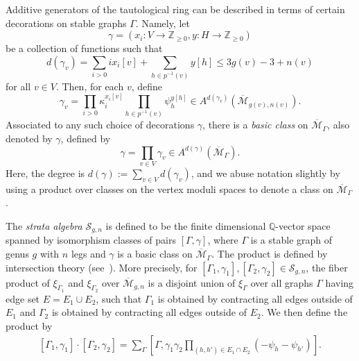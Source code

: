 \documentclass[12pt,reqno]{amsart}
\theoremstyle{plain}
\theoremstyle{definition}
\theoremstyle{remark}
\begin{document}
Additive generators of the tautological ring can be described in terms of certain decorations on stable graphs $\Gamma$.  Namely, let
\begin{equation*}
\gamma=(x_i:V\to \mathbb{Z}_{\geq 0},y:H\to \mathbb{Z}_{\geq 0})
\end{equation*}
be a collection of functions such that
\begin{equation*}
d(\gamma_v)=\sum_{i>0}ix_i[v]+\sum_{h\in p^{-1}(v)} y[h]\leq 3g(v)-3+n(v)
\end{equation*}
for all $v\in V$.  Then, for each $v$, define
\begin{equation*}
\gamma_v=\prod_{i>0}\kappa_i^{x_i[v]}\prod_{h\in p^{-1}(v)}
\psi_h^{y[h]}\in A^{d(\gamma_v)}(\overline{\mathcal{M}}_{g(v),n(v)}).
\end{equation*}
Associated to any such choice of decorations $\gamma$, there is a {\it basic class} on $\overline{\mathcal{M}}_{\Gamma}$, also denoted by $\gamma$, defined by
\begin{equation*}
\gamma=\prod_{v\in V}\gamma_v \in A^{d(\gamma)}(\overline{\mathcal{M}}_{\Gamma}).
\end{equation*}
Here, the degree is $d(\gamma):=\sum_{v\in V}d(\gamma_v)$, and we abuse notation slightly by using a product over classes on the vertex moduli spaces to denote a class on $\overline{\mathcal{M}}_{\Gamma}$.

The {\it strata algebra} $\mathcal{S}_{g,n}$ is defined to be  the finite dimensional $\mathbb{Q}$-vector space spanned by isomorphism classes of pairs $[\Gamma,\gamma]$, where $\Gamma$ is a stable graph of genus $g$ with $n$ legs and $\gamma$ is a basic class on $\overline{\mathcal{M}}_{\Gamma}$.  The product is defined by intersection theory (see~\cite{faber1999algorithms}).  More precisely, for $[\Gamma_1,\gamma_1], [\Gamma_2,\gamma_2]\in \mathcal{S}_{g,n}$, the fiber product of $\xi_{\Gamma_1}$ and $\xi_{\Gamma_2}$ over $\overline{\mathcal{M}}_{g,n}$ is a disjoint union of $\xi_{\Gamma}$ over all graphs $\Gamma$ having edge set $E=E_1\cup E_2$, such that $\Gamma_1$ is obtained by contracting all edges outside of $E_1$ and $\Gamma_2$ is obtained by contracting all edges outside of $E_2$. We then define the product by
\begin{align}\label{eqn:stra-prod}
[\Gamma_1,\gamma_1]\cdot [\Gamma_2,\gamma_2]=\sum_{\Gamma}\left[\Gamma,\gamma_1\gamma_2\prod_{(h,h')\in E_1\cap E_2}(-\psi_h-\psi_{h'})\right].
\end{align}
\end{document}
